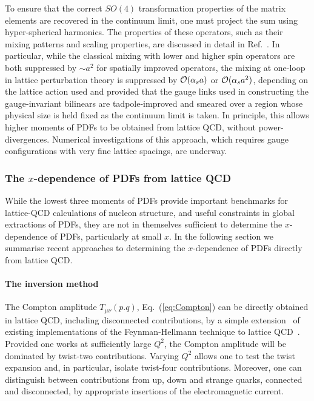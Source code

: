 To ensure that the correct $SO(4)$ transformation properties of the matrix elements are recovered in the continuum limit, one must project the sum using hyper-spherical harmonics.
%
The properties of these operators, such as their mixing patterns and scaling properties, are discussed in detail in
Ref.~\cite{Davoudi:2012ya}.
%
In particular, while the classical mixing with lower and higher spin operators are both suppressed by $\sim a^2$ for spatially improved operators, the mixing at one-loop in lattice perturbation theory is suppressed by ${\cal O}(\alpha_s a)$ or ${\cal O}(\alpha_s a^2)$, depending on the lattice action used and provided that the gauge links used in constructing the gauge-invariant bilinears are tadpole-improved and smeared over a region whose physical size is held fixed as the continuum limit is taken. In principle, this allows higher moments of PDFs to be obtained from lattice QCD, without power-divergences. Numerical investigations of this approach,
which requires gauge configurations with very fine lattice spacings, are underway.

\subsubsection{The $x$-dependence of PDFs from lattice QCD}

While the lowest three moments of PDFs provide important benchmarks for lattice-QCD calculations of nucleon structure, and useful constraints in global extractions of PDFs, they are not in themselves sufficient to determine the $x$-dependence of PDFs, particularly at small $x$.
%
In the following section we summarise recent approaches to determining the $x$-dependence of PDFs directly from lattice QCD.

\paragraph*{The inversion method} 
\label{Sec:InversionMethod}

The Compton amplitude $T_{\mu\nu}(p.q)$, Eq.~(\ref{eq:Compton}) can be
directly obtained in lattice QCD, including disconnected contributions,  by a simple extension~\cite{Chambers:2017dov} of existing implementations of the Feynman-Hellmann technique to lattice QCD~\cite{Horsley:2012pz,Chambers:2014qaa,Chambers:2015bka}.
%
Provided one works at sufficiently large $Q^2$, the Compton amplitude will be dominated by twist-two contributions.
%
Varying $Q^2$ allows one to test the twist expansion and, in particular, isolate twist-four contributions. Moreover, one can distinguish between contributions from up, down and strange quarks, connected and disconnected, by appropriate insertions of the electromagnetic current.

